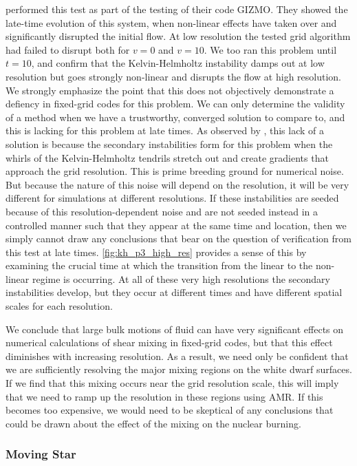 \documentclass[iop]{../emulateapj}
\begin{document}
\citet{hopkins:2015} performed this test as part of the testing of
their code GIZMO.  They showed the late-time evolution of this system,
when non-linear effects have taken over and significantly disrupted
the initial flow. At low resolution the tested grid algorithm
had failed to disrupt both for $v = 0$ and $v = 10$. We too ran this
problem until $t = 10$, and confirm that the Kelvin-Helmholtz
instability damps out at low resolution but goes strongly non-linear
and disrupts the flow at high resolution.  We strongly
emphasize the point that this does not objectively demonstrate a
defiency in fixed-grid codes for this problem. We can only determine
the validity of a method when we have a trustworthy, converged
solution to compare to, and this is lacking for this problem at late
times. As observed by \citeauthor{mcnally:2012}, this lack of a solution is because the
secondary instabilities form for this problem when the whirls of the
Kelvin-Helmholtz tendrils stretch out and create gradients that
approach the grid resolution. This is prime breeding ground for
numerical noise. But because the nature of this noise will depend on
the resolution, it will be very different for simulations at different
resolutions. If these instabilities are seeded because of this
resolution-dependent noise and are not seeded instead in a controlled
manner such that they appear at the same time and location, then we
simply cannot draw any conclusions that bear on the question of
verification from this test at late times.
\autoref{fig:kh_p3_high_res} provides a sense of this by examining the
crucial time at which the transition from the linear to the non-linear
regime is occurring.  At all of these very high resolutions the
secondary instabilities develop, but they occur at different times and
have different spatial scales for each resolution.

We conclude that large bulk motions of fluid can have very significant effects 
on numerical calculations of shear mixing in fixed-grid codes, but that this effect 
diminishes with increasing resolution. As a result, we need only be confident that we are 
sufficiently resolving the major mixing regions on the white dwarf surfaces. 
If we find that this mixing occurs near the grid resolution scale, this will imply 
that we need to ramp up the resolution in these regions using AMR. If this becomes 
too expensive, we would need to be skeptical of any conclusions that could be drawn 
about the effect of the mixing on the nuclear burning.

\subsubsection{Moving Star}\label{sec:moving_star}
\end{document}
